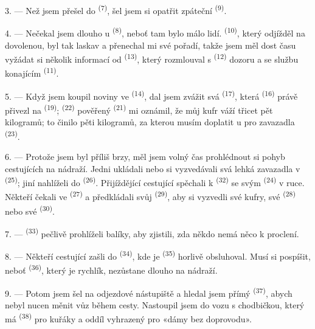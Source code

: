 3. --- Než jsem přešel do  \textsuperscript{(7)}, šel jsem si opatřit
zpáteční  \textsuperscript{(9)}.

4. --- Nečekal jsem dlouho u  \textsuperscript{(8)}, neboť tam bylo málo
lidí.  \textsuperscript{(10)}, který odjížděl na dovolenou, byl tak
laskav a přenechal mi své pořadí, takže jsem měl dost času vyžádat si několik informací
od  \textsuperscript{(13)}, který rozmlouval s
 \textsuperscript{(12)} dozoru a se službu konajícím
 \textsuperscript{(11)}.

\VUsaut{3.0mm}

5. --- Když jsem koupil noviny ve  \textsuperscript{(14)}, dal jsem
zvážit svá  \textsuperscript{(17)}, která 
\textsuperscript{(16)} právě přivezl na 
\textsuperscript{(19)};  \textsuperscript{(22)} pověřený
 \textsuperscript{(21)} mi oznámil, že můj kufr váží třicet pět
kilogramů; to činilo  pěti kilogramů, za kterou musím doplatit u
 pro zavazadla \textsuperscript{(23)}.

6. --- Protože jsem byl příliš brzy, měl jsem volný čas prohlédnout si pohyb cestujících
na nádraží. Jedni ukládali nebo si vyzvedávali svá lehká zavazadla v
 \textsuperscript{(25)}; jiní nahlíželi do 
\textsuperscript{(26)}. Přijíždějící cestující spěchali k 
\textsuperscript{(32)} se svým  \textsuperscript{(24)} v ruce. Někteří
čekali ve  \textsuperscript{(27)} a předkládali svůj
 \textsuperscript{(29)}, aby si vyzvedli své kufry, své 
\textsuperscript{(28)} nebo své  \textsuperscript{(30)}.

7. ---  \textsuperscript{(33)} pečlivě prohlíželi
balíky, aby zjistili, zda někdo nemá něco k proclení.

8. --- Někteří cestující zašli do  \textsuperscript{(34)}, kde je
 \textsuperscript{(35)} horlivě obsluhoval. Musí si pospíšit, neboť
 \textsuperscript{(36)}, který je rychlík, nezůstane dlouho na nádraží.

9. --- Potom jsem šel na odjezdové nástupiště a hledal jsem přímý 
\textsuperscript{(37)}, abych nebyl nucen měnit vůz během cesty. Nastoupil jsem do vozu
s chodbičkou, který má  \textsuperscript{(38)} pro kuřáky a oddíl
vyhrazený pro «dámy bez doprovodu».

